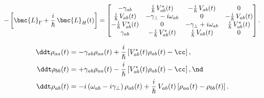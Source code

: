 \begin{equation}
-\left[\bmc{L}_\Gamma + \frac{i}{\hbar}\, \bmc{L}_H(t) \right] = \begin{bmatrix}
 -\gamma_{a b} & \frac{i}{\hslash}\, V^\ast_{a b}(t) & -\frac{i}{\hslash}\, V_{a b}(t) & 0 \\
 \frac{i}{\hslash}\, V_{a b}(t) & -\gamma_\perp - i \omega_{a b} & 0 & -\frac{i}{\hslash}\, V_{a b}(t) \\
 -\frac{i}{\hslash}\, V^\ast_{a b}(t) & 0 & -\gamma_\perp + i \omega_{a b} & \frac{i}{\hslash}\, V^\ast_{a b}(t) \\
 \gamma_{a b} & -\frac{i}{\hslash}\, V^\ast_{a b}(t) & \frac{i}{\hslash}\, V_{a b}(t) & 0
 \end{bmatrix} .
 \end{equation}

 \begin{subequations} \label{eqn:tls_dmem}
 \begin{align}
\label{eqn:tls_dmem_aa} \ddt \rho_{a a}(t) &= -\gamma_{a b} \rho_{a a}(t) + \frac{i}{\hslash} \left[ V^\ast_{a b}(t) \rho_{a b}(t) - \cc \right] , \\
\label{eqn:tls_dmem_bb} \ddt \rho_{b b}(t) &= +\gamma_{a b} \rho_{a a}(t) - \frac{i}{\hslash} \left[ V^\ast_{a b}(t) \rho_{a b}(t) - \cc \right] , \nd \\
\label{eqn:tls_dmem_ab} \ddt \rho_{a b}(t) &= -i \left( \omega_{a b} - i \gamma_\perp \right) \rho_{a b}(t) + \frac{i}{\hslash}\, V_{a b}(t) \left[ \rho_{a a}(t) - \rho_{b b}(t) \right] .
 \end{align}
 \end{subequations}

